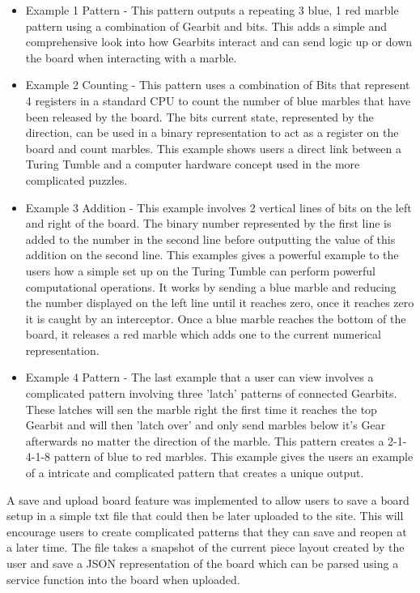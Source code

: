 \documentclass{l4proj}
\begin{document}
\begin{itemize}
    \item Example 1 Pattern - This pattern outputs a repeating 3 blue, 1 red marble pattern using a combination of Gearbit and bits. This adds a simple and comprehensive look into how Gearbits interact and can send logic up or down the board when interacting with a marble.
    \item Example 2 Counting - This pattern uses a combination of Bits that represent 4 registers in a standard CPU to count the number of blue marbles that have been released by the board. The bits current state, represented by the direction, can be used in a binary representation to act as a register on the board and count marbles. This example shows users a direct link between a Turing Tumble and a computer hardware concept used in the more complicated puzzles.
    \item Example 3 Addition - This example involves 2 vertical lines of bits on the left and right of the board. The binary number represented by the first line is added to the number in the second line before outputting the value of this addition on the second line. This examples gives a powerful example to the users how a simple set up on the Turing Tumble can perform powerful computational operations. It works by sending a blue marble and reducing the number displayed on the left line until it reaches zero, once it reaches zero it is caught by an interceptor. Once a blue marble reaches the bottom of the board, it releases a red marble which adds one to the current numerical representation.
    \item  Example 4 Pattern - The last example that a user can view involves a complicated pattern involving three 'latch' patterns of connected Gearbits. These latches will sen the marble right the first time it reaches the top Gearbit and will then 'latch over' and only send marbles below it's Gear afterwards no matter the direction of the marble. This pattern creates a 2-1-4-1-8 pattern of blue to red marbles. This example gives the users an example of a intricate and complicated pattern that creates a unique output.
\end{itemize}

A save and upload board feature was implemented to allow users to save a board setup in a simple txt file that could then be later uploaded to the site. This will encourage users to create complicated patterns that they can save and reopen at a later time. The file takes a snapshot of the current piece layout created by the user and save a JSON representation of the board which can be parsed using a service function into the board when uploaded.
\end{document}
